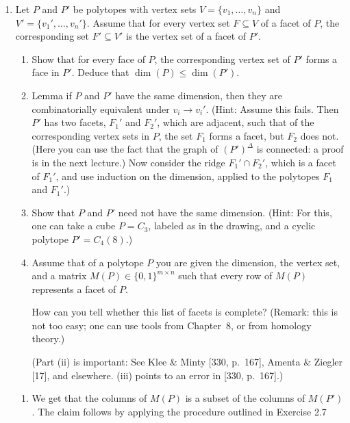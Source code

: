 \documentclass{article}
\begin{document}
\begin{enumerate}
\begin{solution}
Lastly, we have that $M(P^{\Delta}) = M(P)^\intercal$.
\end{solution}

\item Let $P$ and $P'$ be polytopes with vertex sets $V = \{v_1,\dots,v_n\}$ and $V' = \{v_1',\dots,v_n'\}$. Assume that for every vertex set $F \subseteq V$ of a facet of $P$, the corresponding set $F' \subseteq V'$ is the vertex set of a facet of $P'$. 
\begin{enumerate}[label=(\roman*)] 
\item Show that for every face of $P$, the corresponding vertex set of $P'$ forms a face in $P'$. Deduce that $\dim(P) \le \dim(P')$. 

\item Lemma if $P$ and $P'$ have the same dimension, then they are combinatorially equivalent under $v_i \to v_i'$. (Hint: Assume this fails. Then $P'$ has two facets, $F_1'$ and $F_2'$, which are adjacent, such that of the corresponding vertex sets in $P$, the set $F_1$ forms a facet, but $F_2$ does not. (Here you can use the fact that the graph of $(P')^\Delta$ is connected: a proof is in the next lecture.) Now consider the ridge $F_1' \cap F_2'$, which is a facet of $F_1'$, and use induction on the dimension, applied to the polytopes $F_1$ and $F_1'$.) 

\item Show that $P$ and $P'$ need not have the same dimension. (Hint: For this, one can take a cube $P = C_3$, labeled as in the drawing, and a cyclic polytope $P' = C_4(8)$.)

\item Assume that of a polytope $P$ you are given the dimension, the vertex set, and a matrix $M(P) \in \{0,1\}^{m\times n}$ such that every row of $M(P)$ represents a facet of $P$. 

How can you tell whether this list of facets is complete? (Remark: this is not too easy; one can use tools from Chapter~8, or from homology theory.) 

(Part (ii) is important: See Klee \& Minty [330, p.~167], Amenta \& Ziegler [17], and elsewhere. (iii) points to an error in [330, p.~167].)
\end{enumerate} 
\begin{solution}
\begin{enumerate}[label=(\roman*)] 
    \item We get that the columns of $M(P)$ is a subset of the columns of $M(P')$. The claim follows by applying the procedure outlined in Exercise 2.7


\end{enumerate}
\end{solution}
\end{enumerate}
\end{document}
